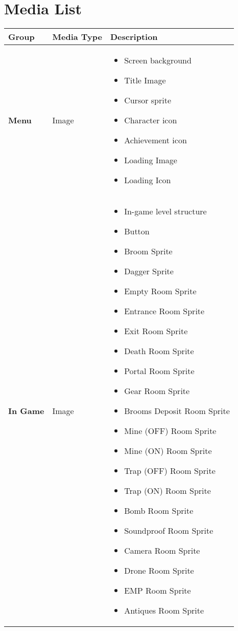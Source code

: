 \section{Media List}

\begin{tabular}{|m{3cm}|m{3cm}|m{7cm}|}
	\hline
	\textbf{Group} & \textbf{Media Type} & \textbf{Description}\\
	\hline
	 \textbf{Menu}& Image & 
	 \begin{itemize}
	 	\item Screen background
	 	\item Title Image
	 	\item Cursor sprite
	 	\item Character icon
	 	\item Achievement icon
	 	\item Loading Image
	 	\item Loading Icon
	 \end{itemize}
	 	\\
    \hline
     \textbf{In Game}& Image & 
     \begin{itemize}
     	\item In-game level structure
     	\item Button
     	\item Broom Sprite
     	\item Dagger Sprite
     	\item Empty Room Sprite
     	\item Entrance Room Sprite
     	\item Exit Room Sprite
     	\item Death Room Sprite
     	\item Portal Room Sprite
     	\item Gear Room Sprite
     	\item Brooms Deposit Room Sprite
     	\item Mine (OFF) Room Sprite
     	\item Mine (ON) Room Sprite
     	\item Trap (OFF) Room Sprite
     	\item Trap (ON) Room Sprite
     	\item Bomb Room Sprite
     	\item Soundproof Room Sprite
     	\item Camera Room Sprite
     	\item Drone Room Sprite
     	\item EMP Room Sprite
     	\item Antiques Room Sprite
     \end{itemize}
 		\\
\end{tabular}
   	
